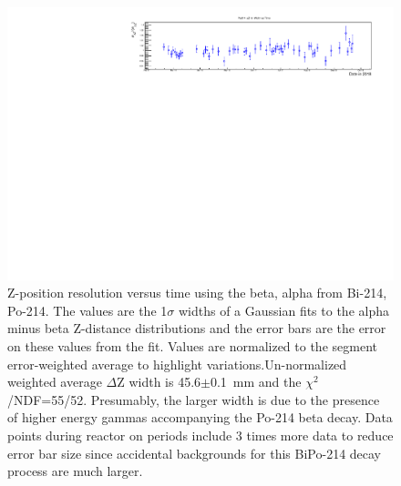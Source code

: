 \begin{figure}[!h]
\centering
\includegraphics[width=1.05\textwidth]{figures/PubBiPo214ZresvsT.pdf}
\caption{\label{fig:ZresvsT214}Z-position resolution versus time using the beta, alpha from Bi-214, Po-214. The values are the 1$\sigma$ widths of a Gaussian fits to the alpha minus beta Z-distance distributions and the error bars are the error on these values from the fit. Values are normalized to the segment error-weighted average to highlight variations.Un-normalized weighted average $\Delta$Z width is 45.6$\pm$0.1~mm and the $\chi^2$/NDF=55/52. Presumably, the larger width is due to the presence of higher energy gammas accompanying the Po-214 beta decay. Data points during reactor on periods include 3 times more data to reduce error bar size since accidental backgrounds for this BiPo-214 decay process are much larger.}
\end{figure}
\newpage

\newpage
